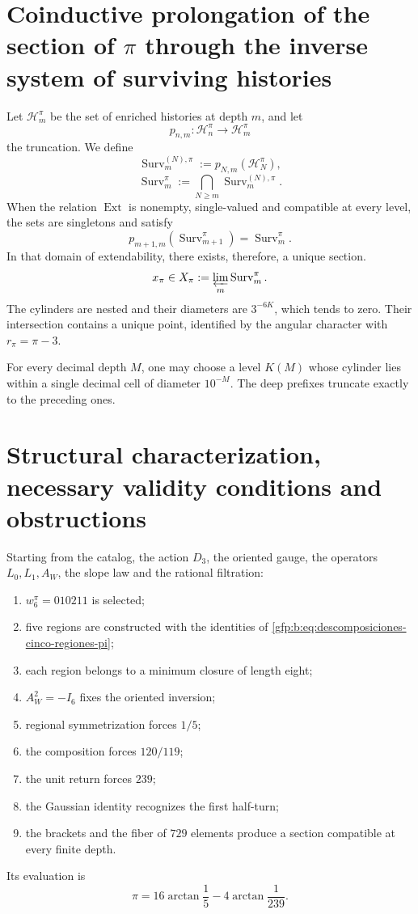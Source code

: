 \section{Coinductive prolongation of the section of \(\pi\) through the inverse system of surviving histories}

Let \(\mathcal H_m^\pi\) be the set of enriched histories at depth
\(m\), and let
\[
 p_{n,m}:\mathcal H_n^\pi\longrightarrow\mathcal H_m^\pi
\]
the truncation. We define
\[
 \operatorname{Surv}_m^{(N),\pi}
 :=p_{N,m}(\mathcal H_N^\pi),
\]
\[
 \operatorname{Surv}_m^\pi
 :=\bigcap_{N\geq m}\operatorname{Surv}_m^{(N),\pi}.
\]
When the relation \(\operatorname{Ext}\) is nonempty, single-valued and
compatible at every level, the sets are singletons and satisfy
\[
 p_{m+1,m}(\operatorname{Surv}_{m+1}^{\pi})
 =\operatorname{Surv}_{m}^{\pi}.
\]
In that domain of extendability, there exists, therefore, a unique section.
\[
 x_\pi\in
 X_\pi:=\varprojlim_m\operatorname{Surv}_m^\pi.
\]
The cylinders are nested and their diameters are \(3^{-6K}\), which tends to
zero. Their intersection contains a unique point, identified by the angular
character with \(r_\pi=\pi-3\).

For every decimal depth \(M\), one may choose a level \(K(M)\) whose
cylinder lies within a single decimal cell of diameter \(10^{-M}\).
The deep prefixes truncate exactly to the preceding ones.

\section{Structural characterization, necessary validity conditions and obstructions}

\begin{theorem}
\label{gfp:b:thm:caracterizacion-final-pi-autonoma}
Starting from the catalog, the action \(D_3\), the oriented gauge, the
operators \(L_0,L_1,A_W\), the slope law and the rational filtration:
\begin{enumerate}
 \item \(w_6^\pi=010211\) is selected;
 \item five regions are constructed with the identities of
       \eqref{gfp:b:eq:descomposiciones-cinco-regiones-pi};
 \item each region belongs to a minimum closure of length eight;
 \item \(A_W^2=-I_6\) fixes the oriented inversion;
 \item regional symmetrization forces \(1/5\);
 \item the composition forces \(120/119\);
 \item the unit return forces \(239\);
 \item the Gaussian identity recognizes the first half-turn;
 \item the brackets and the fiber of \(729\) elements produce a section
       compatible at every finite depth.
\end{enumerate}
Its evaluation is
\[
 \boxed{\pi=16\arctan\frac15-4\arctan\frac1{239}.}
\]
\end{theorem}

